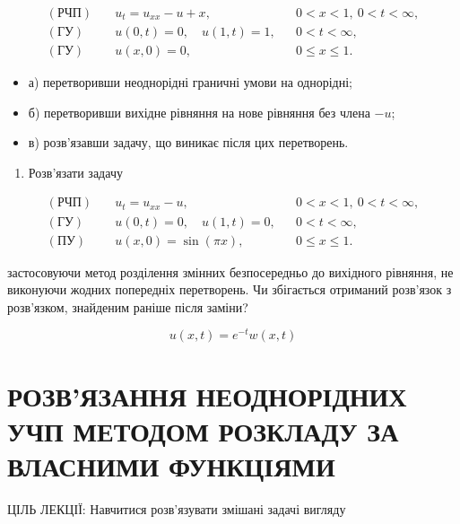 \documentclass[
  ukrainian,
]{article}
\providecommand{\tightlist}{%
  \setlength{\itemsep}{0pt}\setlength{\parskip}{0pt}}
\begin{document}
\[
\begin{aligned}
(\text{РЧП})\quad & u_t = u_{xx} - u + x, && 0 < x < 1,\ 0 < t < \infty, \\
(\text{ГУ})\quad & u(0,t) = 0,\quad u(1,t) = 1, && 0 < t < \infty, \\
(\text{ГУ})\quad & u(x,0) = 0, && 0 \leqslant x \leqslant 1.
\end{aligned}
\]

\begin{itemize}
\tightlist
\item
  а) перетворивши неоднорідні граничні умови на однорідні;
\item
  б) перетворивши вихідне рівняння на нове рівняння без члена \(-u\);
\item
  в) розв'язавши задачу, що виникає після цих перетворень.
\end{itemize}

\begin{enumerate}
\def\labelenumi{\arabic{enumi}.}
\setcounter{enumi}{2}
\tightlist
\item
  Розв'язати задачу
\end{enumerate}

\[
\begin{aligned}
(\text{РЧП})\quad & u_t = u_{xx} - u, && 0 < x < 1,\ 0 < t < \infty, \\
(\text{ГУ})\quad & u(0,t) = 0,\quad u(1,t) = 0, && 0 < t < \infty, \\
(\text{ПУ})\quad & u(x,0) = \sin(\pi x), && 0 \leqslant x \leqslant 1.
\end{aligned}
\]

застосовуючи метод розділення змінних безпосередньо до вихідного
рівняння, не виконуючи жодних попередніх перетворень. Чи збігається
отриманий розв'язок з розв'язком, знайденим раніше після заміни?

\[
u(x,t) = e^{-t}w(x,t)
\]

\section{РОЗВ'ЯЗАННЯ НЕОДНОРІДНИХ УЧП МЕТОДОМ РОЗКЛАДУ ЗА ВЛАСНИМИ
ФУНКЦІЯМИ}\label{ux440ux43eux437ux432ux44fux437ux430ux43dux43dux44f-ux43dux435ux43eux434ux43dux43eux440ux456ux434ux43dux438ux445-ux443ux447ux43f-ux43cux435ux442ux43eux434ux43eux43c-ux440ux43eux437ux43aux43bux430ux434ux443-ux437ux430-ux432ux43bux430ux441ux43dux438ux43cux438-ux444ux443ux43dux43aux446ux456ux44fux43cux438}

ЦІЛЬ ЛЕКЦІЇ: Навчитися розв'язувати змішані задачі вигляду
\end{document}
